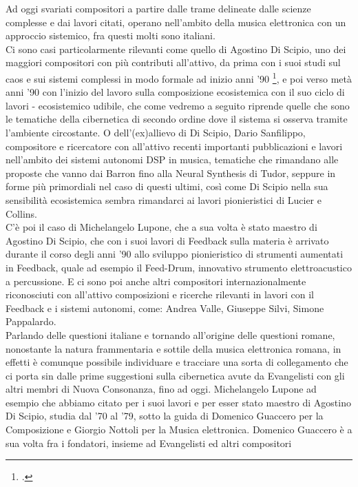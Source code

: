 Ad oggi svariati compositori a partire dalle trame delineate dalle scienze complesse e
dai lavori citati, operano nell'ambito della musica elettronica con un approccio sistemico,
fra questi molti sono italiani. \\
Ci sono casi particolarmente rilevanti come quello di Agostino Di Scipio,
uno dei maggiori compositori con più contributi all'attivo,
da prima con i suoi studi sul caos e sui sistemi complessi in modo formale ad inizio
anni '90 \footcite{discipioiterated},
e poi verso metà anni '90 con l'inizio del lavoro sulla composizione ecosistemica
con il suo ciclo di lavori
- ecosistemico udibile, che come vedremo a seguito riprende
quelle che sono le tematiche della cibernetica di secondo ordine dove
il sistema si osserva tramite l'ambiente circostante.
O dell'(ex)allievo di Di Scipio, Dario Sanfilippo,
compositore e ricercatore con all'attivo recenti importanti pubblicazioni e lavori
nell'ambito dei sistemi autonomi DSP in musica, tematiche che rimandano
alle proposte che vanno dai Barron fino alla Neural Synthesis di Tudor,
seppure in forme più primordiali nel caso di questi ultimi,
così come Di Scipio nella sua sensibilità ecosistemica sembra rimandarci ai
lavori pionieristici di Lucier e Collins. \\
C'è poi il caso di Michelangelo Lupone, che a sua volta è stato maestro
di Agostino Di Scipio,
che con i suoi lavori di Feedback sulla materia è arrivato durante il corso degli
anni '90 allo sviluppo
pionieristico di strumenti aumentati in Feedback, quale ad esempio il Feed-Drum,
innovativo strumento elettroacustico a percussione.
E ci sono poi anche altri compositori internazionalmente riconosciuti
con all'attivo composizioni e ricerche rilevanti in lavori con il Feedback
e i sistemi autonomi, come: Andrea Valle, Giuseppe Silvi, Simone Pappalardo. \\
Parlando delle questioni italiane e tornando all'origine delle questioni romane,
nonostante la natura frammentaria e sottile della musica elettronica romana,
in effetti è comunque possibile individuare e tracciare una sorta di collegamento
che ci porta sin dalle prime suggestioni sulla cibernetica avute da Evangelisti
con gli altri membri di Nuova Consonanza, fino ad oggi.
Michelangelo Lupone ad esempio che abbiamo citato per i suoi lavori
e per esser stato maestro di Agostino Di Scipio, studia dal ’70 al ’79,
sotto la guida di Domenico Guaccero per la Composizione
e Giorgio Nottoli per la Musica elettronica.
Domenico Guaccero è a sua volta fra i fondatori, insieme ad Evangelisti
ed altri compositori

